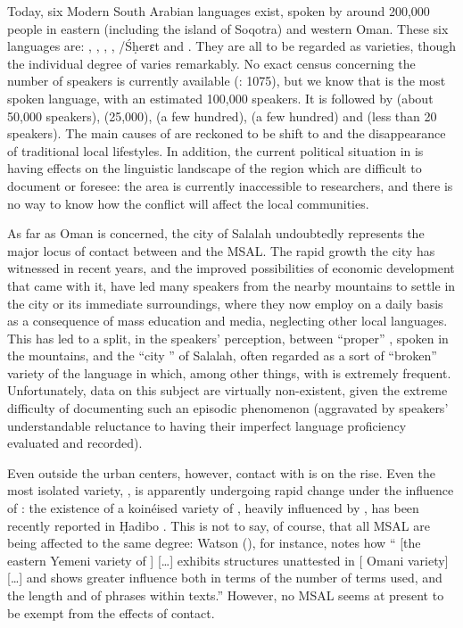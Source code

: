 \documentclass[output=paper]{langsci/langscibook}
\begin{document}
Today, six Modern South Arabian languages exist, spoken by around 200,000 people in eastern  (including the island of Soqotra) and western Oman. These six languages are: , , , , /Śḥerɛt and . They are all to be regarded as  varieties, though the individual degree of  varies remarkably. No exact census concerning the number of speakers is currently available (\citealt{Simeone-Senelle2011}: 1075), but we know that  is the most spoken language, with an estimated 100,000 speakers. It is followed by  (about 50,000 speakers),  (25,000),  (a few hundred),  (a few hundred) and  (less than 20 speakers). The main causes of  are reckoned to be shift to  and the disappearance of traditional local lifestyles. In addition, the current political situation in  is having effects on the linguistic landscape of the region which are difficult to document or foresee: the area is currently inaccessible to researchers, and there is no way to know how the conflict will affect the local communities.\pagebreak

As far as Oman is concerned, the city of Salalah undoubtedly represents the major locus of contact between  and the MSAL. The rapid growth the city has witnessed in recent years, and the improved possibilities of economic development that came with it, have led many  speakers from the nearby mountains to settle in the city or its immediate surroundings, where they now employ  on a daily basis as a consequence of mass education and media, neglecting other local languages. This has led to a split, in the speakers’ perception, between ``proper'' , spoken in the mountains, and the ``city '' of Salalah, often regarded as a sort of ``broken'' variety of the language in which, among other things,  with  is extremely frequent. Unfortunately, data on this subject are virtually non-existent, given the extreme difficulty of documenting such an episodic phenomenon (aggravated by speakers’ understandable reluctance to having their imperfect language proficiency evaluated and recorded). 

Even outside the urban centers, however, contact with  is on the rise. Even the most isolated variety, , is apparently undergoing rapid change under the influence of : the existence of a koinéised variety of , heavily influenced by , has been recently reported in Ḥadibo \citep[27]{Morris2017}. This is not to say, of course, that all MSAL are being affected to the same degree: Watson (\citeyear[3]{Watson2012}), for instance, notes how “ [the eastern {Yemeni} variety of ] […] exhibits structures unattested in  [ Omani variety] […] and shows greater  influence both in terms of the number of  terms used, and the length and  of  phrases within texts.” However, no MSAL seems at present to be exempt from the effects of contact.
\end{document}
